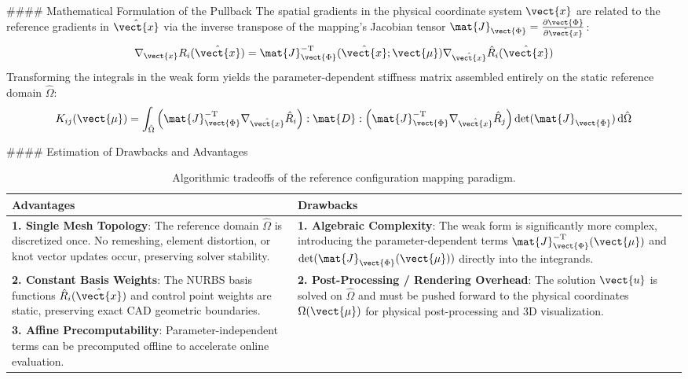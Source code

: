 #### Mathematical Formulation of the Pullback
The spatial gradients in the physical coordinate system $\vect{x}$ are related to the reference gradients in $\hat{\vect{x}}$ via the inverse transpose of the mapping's Jacobian tensor $\mat{J}_{\vect{\Phi}} = \frac{\partial \vect{\Phi}}{\partial \hat{\vect{x}}}$:
\begin{equation}
\nabla_{\vect{x}} R_i(\hat{\vect{x}}) = \mat{J}_{\vect{\Phi}}^{-\mathrm{T}}(\hat{\vect{x}}; \vect{\mu}) \nabla_{\hat{\vect{x}}} \hat{R}_i(\hat{\vect{x}})
\end{equation}
Transforming the integrals in the weak form yields the parameter-dependent stiffness matrix assembled entirely on the static reference domain $\hat{\Omega}$:
\begin{equation}
K_{ij}(\vect{\mu}) = \int_{\hat{\Omega}} \left( \mat{J}_{\vect{\Phi}}^{-\mathrm{T}} \nabla_{\hat{\vect{x}}} \hat{R}_i \right) : \mat{D} : \left( \mat{J}_{\vect{\Phi}}^{-\mathrm{T}} \nabla_{\hat{\vect{x}}} \hat{R}_j \right) \det(\mat{J}_{\vect{\Phi}}) \, \mathrm{d}\hat{\Omega}
\end{equation}

#### Estimation of Drawbacks and Advantages

\begin{table}[H]
\centering
\caption{Algorithmic tradeoffs of the reference configuration mapping paradigm.}
\label{tab:mapping_tradeoffs}
\begin{tabular}{p{7cm}p{7cm}}
\hline
\textbf{Advantages} & \textbf{Drawbacks} \\ \hline
\textbf{1. Single Mesh Topology}: The reference domain $\hat{\Omega}$ is discretized once. No remeshing, element distortion, or knot vector updates occur, preserving solver stability. & \textbf{1. Algebraic Complexity}: The weak form is significantly more complex, introducing the parameter-dependent terms $\mat{J}_{\vect{\Phi}}^{-\mathrm{T}}(\vect{\mu})$ and $\det(\mat{J}_{\vect{\Phi}}(\vect{\mu}))$ directly into the integrands. \\
\textbf{2. Constant Basis Weights}: The NURBS basis functions $\hat{R}_i(\hat{\vect{x}})$ and control point weights are static, preserving exact CAD geometric boundaries. & \textbf{2. Post-Processing / Rendering Overhead}: The solution $\vect{u}$ is solved on $\hat{\Omega}$ and must be pushed forward to the physical coordinates $\Omega(\vect{\mu})$ for physical post-processing and 3D visualization. \\
\textbf{3. Affine Precomputability}: Parameter-independent terms can be precomputed offline to accelerate online evaluation. & \\ \hline
\end{tabular}
\end{table}


